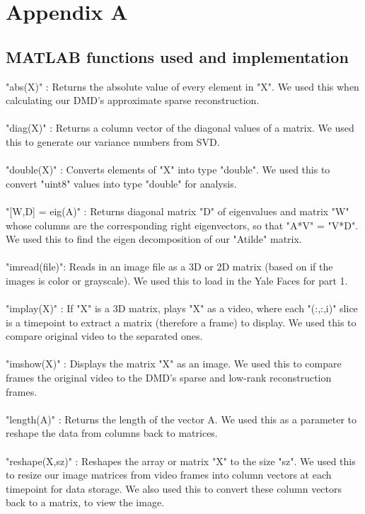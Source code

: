 \documentclass{article}
\begin{document}
\section*{\fontsize{19}{15}\selectfont Appendix A}
\subsection*{MATLAB functions used and implementation}
"abs(X)" : Returns the absolute value of every element in "X". We used this when calculating our DMD's approximate sparse reconstruction. \\ \\
"diag(X)" : Returns a column vector of the diagonal values of a matrix. We used this to generate our variance numbers from SVD. \\ \\
"double(X)" : Converts elements of "X" into type "double". We used this to convert "uint8" values into type "double" for analysis. \\ \\
"[W,D] = eig(A)" : Returns diagonal matrix "D" of eigenvalues and matrix "W" whose columns are the corresponding right eigenvectors, so that "A*V" = "V*D". We used this to find the eigen decomposition of our "Atilde" matrix. \\ \\
"imread(file)": Reads in an image file as a 3D or 2D matrix (based on if the images is color or grayscale). We used this to load in the Yale Faces for part 1. \\ \\
"implay(X)" : If "X" is a 3D matrix, plays "X" as a video, where each "(:,:,i)" slice is a timepoint to extract a matrix (therefore a frame) to display. We used this to compare original video to the separated ones. \\ \\
"imshow(X)" : Displays the matrix "X" as an image. We used this to compare frames the original video to the DMD's sparse and low-rank reconstruction frames. \\ \\
"length(A)" : Returns the length of the vector A. We used this as a parameter to reshape the data from columns back to matrices. \\ \\
"reshape(X,sz)" : Reshapes the array or matrix "X" to the size "sz". We used this to resize our image matrices from video frames into column vectors at each timepoint for data storage. We also used this to convert these column vectors back to a matrix, to view the image. \\ \\
\end{document}
